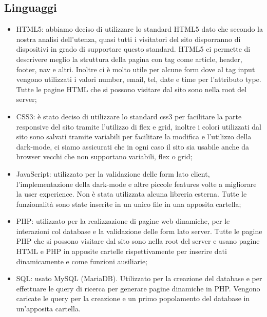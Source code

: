 \documentclass[a4paper]{article}
\begin{document}
	\subsection{Linguaggi}
	\begin{itemize}
		\item HTML5: abbiamo deciso di utilizzare lo standard HTML5 dato che secondo la nostra analisi dell'utenza, quasi tutti i visitatori del sito disporranno di dispositivi in grado di supportare questo standard. HTML5 ci permette di descrivere meglio la struttura della pagina con tag come article, header, footer, nav e altri. Inoltre ci è molto utile per alcune form dove al tag input vengono utilizzati i valori number, email, tel, date e time per l'attributo type. Tutte le pagine HTML che si possono visitare dal sito sono nella root del server;
		\item CSS3: è stato deciso di utilizzare lo standard css3 per facilitare la parte responsive del sito tramite l'utilizzo di flex e grid, inoltre i colori utilizzati dal sito sono salvati tramite variabili per facilitare la modifica e l'utilizzo della dark-mode, ci siamo assicurati che in ogni caso il sito sia usabile anche da browser vecchi che non supportano variabili, flex o grid;
		\item JavaScript: utilizzato per la validazione delle form lato client, l'implementazione della dark-mode e altre piccole features volte a migliorare la user experience. Non è stata utilizzata alcuna libreria esterna. Tutte le funzionalità sono state inserite in un unico file in una apposita cartella;
		\item PHP: utilizzato per la realizzazione di pagine web dinamiche, per le interazioni col database e la validazione delle form lato server. Tutte le pagine PHP che si possono visitare dal sito sono nella root del server e usano pagine HTML e PHP in apposite cartelle rispettivamente per inserire dati dinamicamente e come funzioni ausiliarie;
		\item SQL: usato MySQL (MariaDB). Utilizzato per la creazione del database e per effettuare le query di ricerca per generare pagine dinamiche in PHP. Vengono caricate le query per la creazione e un primo popolamento del database in un'apposita cartella.

	\end{itemize}
\end{document}
